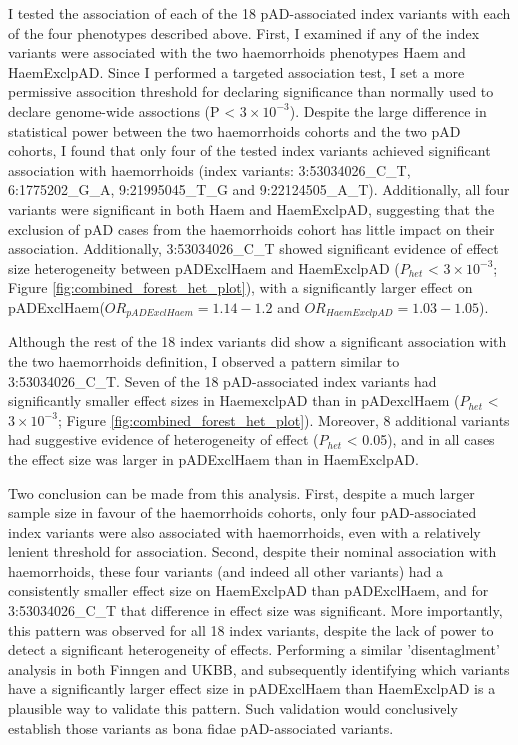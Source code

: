 I tested the association of each of the 18 pAD-associated index variants with each of the four phenotypes described above. First, I examined if any of the index variants were associated with the two haemorrhoids phenotypes Haem and HaemExclpAD. Since I performed a targeted association test, I set a more permissive assocition threshold for declaring significance than normally used to declare genome-wide assoctions (P < $3\times10^{-3}$). Despite the large difference in statistical power between the two haemorrhoids cohorts and the two pAD cohorts, I found that only four of the tested index variants achieved significant association with haemorrhoids (index variants: 3:53034026\_C\_T, 6:1775202\_G\_A, 9:21995045\_T\_G and 9:22124505\_A\_T). Additionally, all four variants were significant in both Haem and HaemExclpAD, suggesting that the exclusion of pAD cases from the haemorrhoids cohort has little impact on their association. Additionally, 3:53034026\_C\_T showed significant evidence of effect size heterogeneity between pADExclHaem and HaemExclpAD ($P_{het}$ < $3\times10^{-3}$; Figure \ref{fig:combined_forest_het_plot}), with a significantly larger effect on pADExclHaem($OR_{pADExclHaem}=1.14-1.2$ and $OR_{HaemExclpAD}=1.03-1.05$).

Although the rest of the 18 index variants did show a significant association with the two haemorrhoids definition, I observed a pattern similar to 3:53034026\_C\_T. Seven of the 18 pAD-associated index variants had significantly smaller effect sizes in HaemexclpAD than in pADexclHaem ($P_{het}$ < $3\times10^{-3}$; Figure \ref{fig:combined_forest_het_plot}). Moreover, 8 additional variants had suggestive evidence of heterogeneity of effect ($P_{het}$ < 0.05), and in all cases the effect size was larger in pADExclHaem than in HaemExclpAD. 

Two conclusion can be made from this analysis. First, despite a much larger sample size in favour of the haemorrhoids cohorts, only four pAD-associated index variants were also associated with haemorrhoids, even with a relatively lenient threshold for association. Second, despite their nominal association with haemorrhoids, these four variants (and indeed all other variants) had a consistently smaller effect size on HaemExclpAD than pADExclHaem, and for 3:53034026\_C\_T that difference in effect size was significant. More importantly, this pattern was observed for all 18 index variants, despite the lack of power to detect a significant heterogeneity of effects. Performing a similar 'disentaglment' analysis in both Finngen and UKBB, and subsequently identifying which variants have a significantly larger effect size in pADExclHaem than HaemExclpAD is a plausible way to validate this pattern. Such validation would conclusively establish those variants as bona fidae pAD-associated variants.\\



